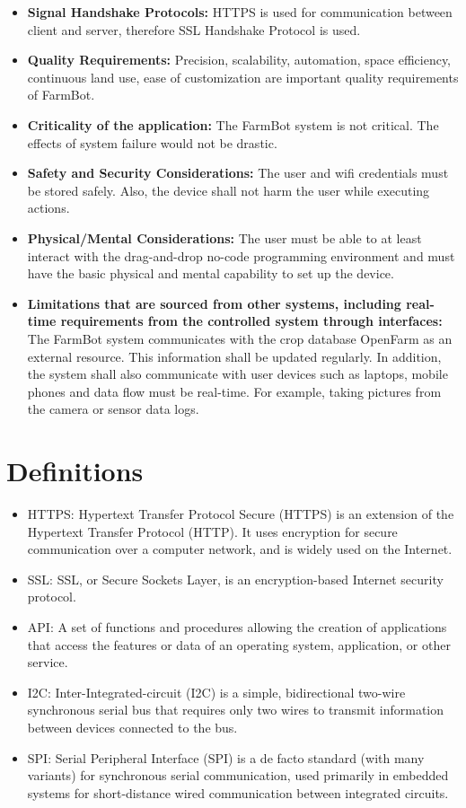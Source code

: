 \begin{itemize}
    \item \textbf{Signal Handshake Protocols:} {HTTPS is used for communication between client and server, therefore SSL Handshake Protocol is used.}
    \item \textbf{Quality Requirements:} {Precision, scalability, automation, space efficiency, continuous land use, ease of customization are important quality requirements of FarmBot.}
    \item \textbf{Criticality of the application:} {The FarmBot system is not critical. The effects of system failure would not be drastic.}
    \item \textbf{Safety and Security Considerations:} {The user and wifi credentials must be stored safely. Also, the device shall not harm the user while executing actions.}
    \item \textbf{Physical/Mental Considerations:} {The user must be able to at least interact with the drag-and-drop no-code programming environment and must have the basic physical and mental capability to set up the device.}
    \item \textbf{Limitations that are sourced from other systems, including real-time requirements
from the controlled system through interfaces:} {The FarmBot system communicates with the crop database OpenFarm as an external resource. This information shall be updated regularly. In addition, the system shall also communicate with user devices such as laptops, mobile phones and data flow must be real-time. For example, taking pictures from the camera or sensor data logs.}
\end{itemize}

\section{Definitions}
\begin{itemize}
    \item HTTPS: Hypertext Transfer Protocol Secure (HTTPS) is an extension of the Hypertext Transfer Protocol (HTTP). It uses encryption for secure communication over a computer network, and is widely used on the Internet.
    \item SSL: SSL, or Secure Sockets Layer, is an encryption-based Internet security protocol.
    \item API: A set of functions and procedures allowing the creation of applications that access the features or data of an operating system, application, or other service.
    \item I2C: Inter-Integrated-circuit (I2C) is a simple, bidirectional two-wire synchronous serial bus that requires only two wires to transmit information between devices connected to the bus. 
    \item SPI: Serial Peripheral Interface (SPI) is a de facto standard (with many variants) for synchronous serial communication, used primarily in embedded systems for short-distance wired communication between integrated circuits.
\end{itemize}
